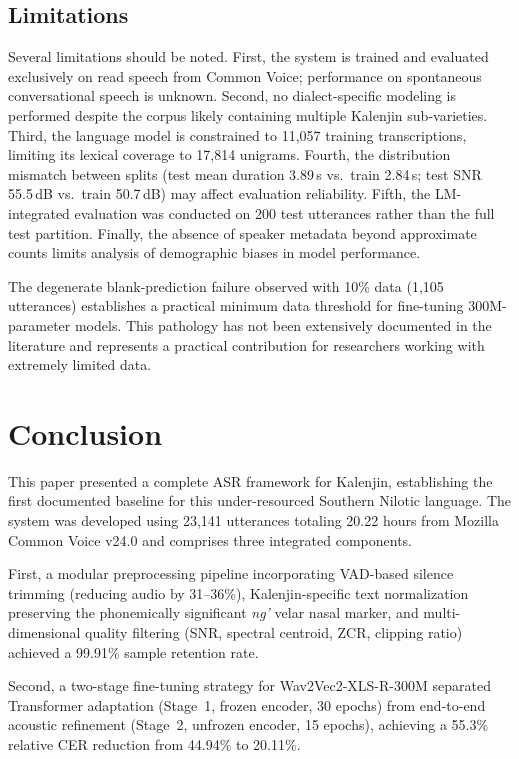 \documentclass[conference]{IEEEtran}
\begin{document}
\subsection{Limitations}

Several limitations should be noted. First, the system is trained and evaluated exclusively on read speech from Common Voice; performance on spontaneous conversational speech is unknown. Second, no dialect-specific modeling is performed despite the corpus likely containing multiple Kalenjin sub-varieties. Third, the language model is constrained to 11,057 training transcriptions, limiting its lexical coverage to 17,814 unigrams. Fourth, the distribution mismatch between splits (test mean duration 3.89\,s vs.\ train 2.84\,s; test SNR 55.5\,dB vs.\ train 50.7\,dB) may affect evaluation reliability. Fifth, the LM-integrated evaluation was conducted on 200 test utterances rather than the full test partition. Finally, the absence of speaker metadata beyond approximate counts limits analysis of demographic biases in model performance.

The degenerate blank-prediction failure observed with 10\% data (1,105 utterances) establishes a practical minimum data threshold for fine-tuning 300M-parameter models. This pathology has not been extensively documented in the literature and represents a practical contribution for researchers working with extremely limited data.

\section{Conclusion}

This paper presented a complete ASR framework for Kalenjin, establishing the first documented baseline for this under-resourced Southern Nilotic language. The system was developed using 23,141 utterances totaling 20.22 hours from Mozilla Common Voice v24.0 and comprises three integrated components.

First, a modular preprocessing pipeline incorporating VAD-based silence trimming (reducing audio by 31--36\%), Kalenjin-specific text normalization preserving the phonemically significant \textit{ng'} velar nasal marker, and multi-dimensional quality filtering (SNR, spectral centroid, ZCR, clipping ratio) achieved a 99.91\% sample retention rate.

Second, a two-stage fine-tuning strategy for Wav2Vec2-XLS-R-300M separated Transformer adaptation (Stage~1, frozen encoder, 30 epochs) from end-to-end acoustic refinement (Stage~2, unfrozen encoder, 15 epochs), achieving a 55.3\% relative CER reduction from 44.94\% to 20.11\%.
\end{document}
